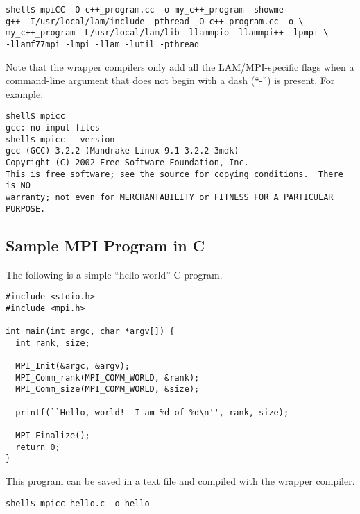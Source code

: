 \lstset{style=lam-cmdline}
\begin{lstlisting}
shell$ mpiCC -O c++_program.cc -o my_c++_program -showme
g++ -I/usr/local/lam/include -pthread -O c++_program.cc -o \
my_c++_program -L/usr/local/lam/lib -llammpio -llammpi++ -lpmpi \
-llamf77mpi -lmpi -llam -lutil -pthread
\end{lstlisting}


Note that the wrapper compilers only add all the LAM/MPI-specific
flags when a command-line argument that does not begin with a dash
(``-'') is present.  For example:

\lstset{style=lam-cmdline}
\begin{lstlisting}
shell$ mpicc
gcc: no input files
shell$ mpicc --version
gcc (GCC) 3.2.2 (Mandrake Linux 9.1 3.2.2-3mdk)
Copyright (C) 2002 Free Software Foundation, Inc.
This is free software; see the source for copying conditions.  There is NO
warranty; not even for MERCHANTABILITY or FITNESS FOR A PARTICULAR PURPOSE.
\end{lstlisting}



\subsection{Sample MPI Program in C}

The following is a simple ``hello world'' C program.

\lstset{style=lam-c}

\begin{lstlisting}
#include <stdio.h>
#include <mpi.h>

int main(int argc, char *argv[]) {
  int rank, size;

  MPI_Init(&argc, &argv);
  MPI_Comm_rank(MPI_COMM_WORLD, &rank);
  MPI_Comm_size(MPI_COMM_WORLD, &size);   

  printf(``Hello, world!  I am %d of %d\n'', rank, size);

  MPI_Finalize();
  return 0;
}
\end{lstlisting}

This program can be saved in a text file and compiled with the
 wrapper compiler.

\lstset{style=lam-cmdline}
\begin{lstlisting}
shell$ mpicc hello.c -o hello
\end{lstlisting}

